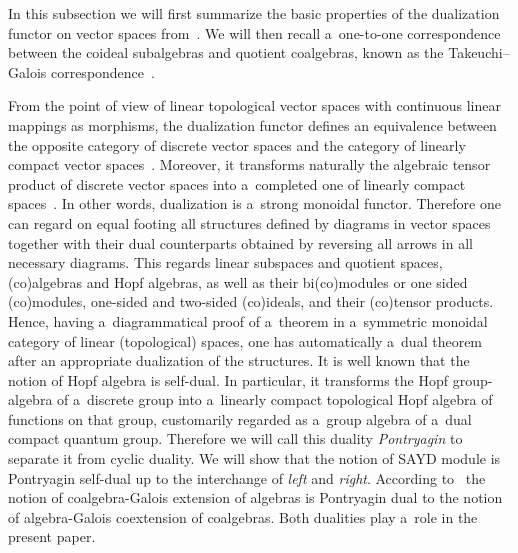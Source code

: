 In this subsection we will f\/irst summarize the basic properties of the dualization functor on vector spaces
from~\cite{BergmanHausknecht-book}.
We will then recall a~one-to-one correspondence between the coideal subalgebras and quotient coalgebras, known as the
Takeuchi--Galois correspondence~\cite{Take72}.

From the point of view of linear topological vector spaces with continuous linear mappings as morphisms, the dualization
functor def\/ines an equivalence between the opposite category of discrete vector spaces and the category of linearly
compact vector spaces~\cite[Proposition~24.8]{BergmanHausknecht-book}.
Moreover, it transforms naturally the algebraic tensor product of discrete vector spaces into a~completed one of
linearly compact spaces~\cite[Corollary~24.25]{BergmanHausknecht-book}.
In other words, dualization is a~strong monoidal functor.
Therefore one can regard on equal footing all structures def\/ined by diagrams in vector spaces together with their dual
counterparts obtained by reversing all arrows in all necessary diagrams.
This regards linear subspaces and quotient spaces, (co)algebras and Hopf algebras, as well as their bi(co)modules or one
sided (co)modules, one-sided and two-sided (co)ideals, and their (co)tensor products.
Hence, having a~diagrammatical proof of a~theorem in a~symmetric monoidal category of linear (topological) spaces, one
has automatically a~dual theorem after an appropriate dualization of the structures.
It is well known that the notion of Hopf algebra is self-dual.
In particular, it transforms the Hopf group-algebra of a~discrete group into a~linearly compact topological Hopf algebra
of functions on that group, customarily regarded as a~group algebra of a~dual compact quantum group.
Therefore we will call this duality \emph{Pontryagin} to separate it from cyclic duality.
We will show that the notion of SAYD module is Pontryagin self-dual up to the interchange of \emph{left} and
\emph{right}.
According to~\cite{Brze97,BrzeHaja99} the notion of coalgebra-Galois extension of algebras is Pontryagin dual to the
notion of algebra-Galois coextension of coalgebras.
Both dualities play a~role in the present paper.

